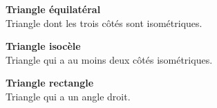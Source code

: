 \begin{tcbraster}[raster columns=2, raster equal height, raster valign=top,raster column skip=2mm, raster row skip=2mm]
\begin{terme}
\textbf{\large Triangle équilatéral}\\[2pt]
{\small Triangle dont les trois côtés sont isométriques.}
\end{terme}
\begin{terme}
\textbf{\large Triangle isocèle}\\[2pt]
{\small Triangle qui a au moins deux côtés isométriques.}
\end{terme}
\begin{terme}
\textbf{\large Triangle rectangle}\\[2pt]
{\small Triangle qui a un angle droit.}
\end{terme}
\end{tcbraster}